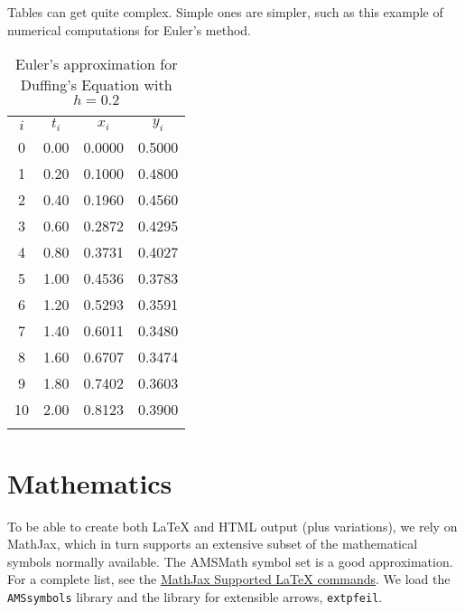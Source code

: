 \documentclass[10pt,]{article}
\theoremstyle{plain}
\theoremstyle{definition}
\theoremstyle{definition}
\theoremstyle{definition}
\theoremstyle{definition}
\theoremstyle{definition}
\theoremstyle{definition}
\numberwithin{equation}{section}
\newcommand{\hrulethin}  {\noalign{\hrule height 0.04em}}
\newcommand{\hrulemedium}{\noalign{\hrule height 0.07em}}
\newcommand{\hrulethick} {\noalign{\hrule height 0.11em}}
\begin{document}
%
\par
\hypertarget{p-172}{}%
Tables can get quite complex.  Simple ones are simpler, such as this example of numerical computations for Euler's method.%
\begin{table}
\centering
\begin{tabular}{cccc}\hrulethick
\(i\)&\(t_i\)&\(x_i\)&\(y_i\)\tabularnewline\hrulethin
0&0.00&0.0000&0.5000\tabularnewline[0pt]
1&0.20&0.1000&0.4800\tabularnewline[0pt]
2&0.40&0.1960&0.4560\tabularnewline[0pt]
3&0.60&0.2872&0.4295\tabularnewline[0pt]
4&0.80&0.3731&0.4027\tabularnewline[0pt]
5&1.00&0.4536&0.3783\tabularnewline[0pt]
6&1.20&0.5293&0.3591\tabularnewline[0pt]
7&1.40&0.6011&0.3480\tabularnewline[0pt]
8&1.60&0.6707&0.3474\tabularnewline[0pt]
9&1.80&0.7402&0.3603\tabularnewline[0pt]
10&2.00&0.8123&0.3900\tabularnewline\hrulemedium
\end{tabular}
\caption{Euler's approximation for Duffing's Equation with \(h = 0.2\)\label{table-euler1}}
\end{table}
\typeout{************************************************}
\typeout{************************************************}
\section[{Mathematics}]{Mathematics}\label{section-7}
\hypertarget{p-173}{}%
To be able to create both \LaTeX{} and HTML output (plus variations), we rely on MathJax, which in turn supports an extensive subset of the mathematical symbols normally available.  The AMSMath symbol set is a good approximation.  For a complete list, see the \href{http://docs.mathjax.org/en/latest/tex.html\#supported-latex-commands}{MathJax Supported LaTeX commands}.  We load the \lstinline?AMSsymbols? library and the library for extensible arrows, \lstinline?extpfeil?.%
\typeout{************************************************}
\typeout{************************************************}
\end{document}
